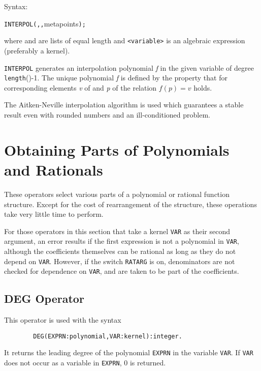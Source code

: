 Syntax:
\begin{syntax}
  \texttt{INTERPOL(}\texttt{,}\texttt{,}meta{points}\texttt{);}
\end{syntax}

where  and  are lists of equal length and
\texttt{<variable>} is an algebraic expression (preferably a kernel).

\texttt{INTERPOL} generates an interpolation polynomial \emph{f} in the given
variable of degree \texttt{length}()-1.  The unique polynomial 
\emph{f}
is defined by the property that for corresponding elements \emph{v} of
 and \emph{p} of  the relation $f(p)=v$ holds.

The Aitken-Neville interpolation algorithm is used which guarantees a
stable result even with rounded numbers and an ill-conditioned problem.

\section{Obtaining Parts of Polynomials and Rationals}

These operators select various parts of a polynomial or rational function
structure. Except for the cost of rearrangement of the structure, these
operations take very little time to perform.

For those operators in this section that take a kernel \texttt{VAR} as their
second argument, an error results if the first expression is not a
polynomial in \texttt{VAR}, although the coefficients themselves can be
rational as long as they do not depend on \texttt{VAR}.  However, if the
switch \texttt{RATARG} is on, denominators are not checked
for dependence on \texttt{VAR}, and are taken to be part of the coefficients.

\subsection{DEG Operator}
\hypertarget{operator:DEG}{}

This operator is used with the syntax
\begin{verbatim}
        DEG(EXPRN:polynomial,VAR:kernel):integer.
\end{verbatim}
It returns the leading degree of the polynomial \texttt{EXPRN}
in the variable \texttt{VAR}.  If \texttt{VAR} does not occur as a variable in
\texttt{EXPRN}, 0 is returned.


